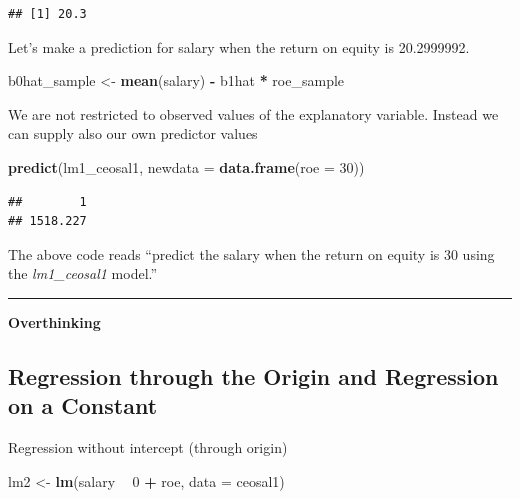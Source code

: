 \documentclass[]{book}
\newenvironment{Shaded}{\begin{snugshade}}{\end{snugshade}}
\newcommand{\DataTypeTok}[1]{\textcolor[rgb]{0.13,0.29,0.53}{#1}}
\newcommand{\DecValTok}[1]{\textcolor[rgb]{0.00,0.00,0.81}{#1}}
\newcommand{\KeywordTok}[1]{\textcolor[rgb]{0.13,0.29,0.53}{\textbf{#1}}}
\newcommand{\NormalTok}[1]{#1}
\newcommand{\OperatorTok}[1]{\textcolor[rgb]{0.81,0.36,0.00}{\textbf{#1}}}
\newcommand{\StringTok}[1]{\textcolor[rgb]{0.31,0.60,0.02}{#1}}
\begin{document}
\begin{verbatim}
## [1] 20.3
\end{verbatim}

Let's make a prediction for salary when the return on equity is
20.2999992.

\begin{Shaded}
\begin{Highlighting}[]
\NormalTok{b0hat_sample <-}\StringTok{ }\KeywordTok{mean}\NormalTok{(salary) }\OperatorTok{-}\StringTok{ }\NormalTok{b1hat }\OperatorTok{*}\StringTok{ }\NormalTok{roe_sample }
\end{Highlighting}
\end{Shaded}

We are not restricted to observed values of the explanatory variable.
Instead we can supply also our own predictor values

\begin{Shaded}
\begin{Highlighting}[]
\KeywordTok{predict}\NormalTok{(lm1_ceosal1, }\DataTypeTok{newdata =} \KeywordTok{data.frame}\NormalTok{(}\DataTypeTok{roe =} \DecValTok{30}\NormalTok{))}
\end{Highlighting}
\end{Shaded}

\begin{verbatim}
##        1 
## 1518.227
\end{verbatim}

The above code reads ``predict the salary when the return on equity is
30 using the \emph{lm1\_ceosal1} model.''

\begin{center}\rule{0.5\linewidth}{\linethickness}\end{center}

\textbf{Overthinking}

\hypertarget{regression-through-the-origin-and-regression-on-a-constant}{%
\subsection{Regression through the Origin and Regression on a
Constant}\label{regression-through-the-origin-and-regression-on-a-constant}}

Regression without intercept (through origin)

\begin{Shaded}
\begin{Highlighting}[]
\NormalTok{lm2 <-}\StringTok{ }\KeywordTok{lm}\NormalTok{(salary }\OperatorTok{~}\StringTok{  }\DecValTok{0} \OperatorTok{+}\StringTok{ }\NormalTok{roe, }\DataTypeTok{data =}\NormalTok{ ceosal1)}
\end{Highlighting}
\end{Shaded}
\end{document}
